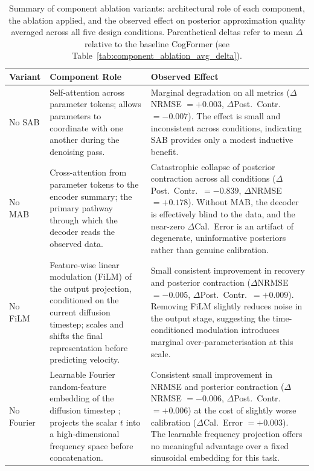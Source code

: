 \begin{table}[t]
\centering
\caption{Summary of component ablation variants: architectural role of each component,
the ablation applied, and the observed effect on posterior approximation quality
averaged across all five design conditions.
Parenthetical deltas refer to mean $\Delta$ relative to the baseline CogFormer
(see Table~\ref{tab:component_ablation_avg_delta}).}
\label{tab:component_ablation_summary}
\begin{tabularx}{\textwidth}{>{\raggedright\arraybackslash}l >{\raggedright\arraybackslash}X >{\raggedright\arraybackslash}X}
\toprule
Variant & Component Role & Observed Effect \\
\midrule
No SAB
  & Self-attention across parameter tokens; allows parameters to coordinate
    with one another during the denoising pass.
  & Marginal degradation on all metrics ($\Delta$NRMSE $= {+0.003}$,
    $\Delta$Post.\ Contr.\ $= {-0.007}$). The effect is small and
    inconsistent across conditions, indicating SAB provides only a modest
    inductive benefit. \\[4pt]
No MAB
  & Cross-attention from parameter tokens to the encoder summary; the primary
    pathway through which the decoder reads the observed data.
  & Catastrophic collapse of posterior contraction across all conditions
    ($\Delta$Post.\ Contr.\ $= {-0.839}$, $\Delta$NRMSE $= {+0.178}$).
    Without MAB, the decoder is effectively blind to the data, and the
    near-zero $\Delta$Cal.\ Error is an artifact of degenerate, uninformative
    posteriors rather than genuine calibration. \\[4pt]
No FiLM
  & Feature-wise linear modulation (FiLM) of the output projection,
    conditioned on the current diffusion timestep; scales and shifts the
    final representation before predicting velocity.
  & Small consistent improvement in recovery and posterior contraction
    ($\Delta$NRMSE $= {-0.005}$, $\Delta$Post.\ Contr.\ $= {+0.009}$).
    Removing FiLM slightly reduces noise in the output stage, suggesting the
    time-conditioned modulation introduces marginal over-parameterisation at
    this scale. \\[4pt]
No Fourier
  & Learnable Fourier random-feature embedding of the diffusion timestep
    \citep{tancik2020fourier}; projects the scalar $t$ into a
    high-dimensional frequency space before concatenation.
  & Consistent small improvement in NRMSE and posterior contraction
    ($\Delta$NRMSE $= {-0.006}$, $\Delta$Post.\ Contr.\ $= {+0.006}$)
    at the cost of slightly worse calibration ($\Delta$Cal.\ Error $= {+0.003}$).
    The learnable frequency projection offers no meaningful advantage over a
    fixed sinusoidal embedding for this task. \\
\bottomrule
\end{tabularx}
\end{table}
